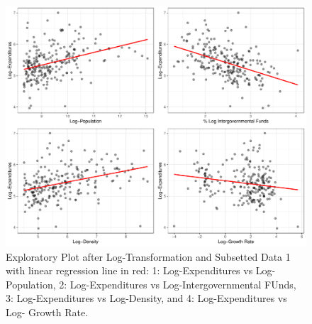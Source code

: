 \documentclass[11pt]{article}\usepackage[]{graphicx}\usepackage[]{color}
\makeatletter
\def\maxwidth{ %
  \ifdim\Gin@nat@width>\linewidth
    \linewidth
  \else
    \Gin@nat@width
  \fi
}
\makeatother
\begin{document}
\begin{figure}[h!] 
\begin{center}

\includegraphics[width=\maxwidth]{figure/unnamed-chunk-5-1} 

\caption{Exploratory Plot after Log-Transformation and Subsetted Data 1 with linear regression line in red: 1: Log-Expenditures vs Log-Population, 2: Log-Expenditures vs Log-Intergovernmental FUnds, 3: Log-Expenditures vs Log-Density, and 4: Log-Expenditures vs Log- Growth Rate.}
\label{sec2-explore}
\end{center} 
\end{figure}
\end{document}
